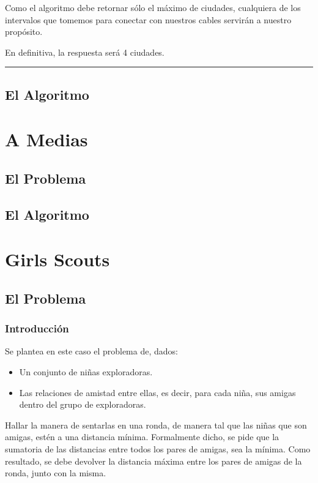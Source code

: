\documentclass[11pt]{article}
\newcommand{\linea}{\noindent\rule{12cm}{0.4pt}}
\begin{document}
Como el algoritmo debe retornar sólo el máximo de ciudades, cualquiera de los intervalos que tomemos para conectar con nuestros cables servirán a nuestro propósito.

En definitiva, la respuesta será 4 ciudades.

\linea

\subsection{El Algoritmo}


\newpage


\section{A Medias}

\subsection{El Problema}

\subsection{El Algoritmo}



\newpage


\section{Girls Scouts}

\subsection{El Problema}
 \subsubsection{Introducción}
Se plantea en este caso el problema de, dados:
\begin{itemize}

\item Un conjunto de niñas exploradoras.

\item Las relaciones de amistad entre ellas, es decir, para cada niña, sus amigas dentro del grupo de exploradoras.
\end{itemize}

Hallar la manera de sentarlas en una ronda, de manera tal que las niñas que son amigas, estén a una distancia mínima. Formalmente dicho, se pide que la sumatoria de las distancias entre todos los pares de amigas, sea la mínima. Como resultado, se debe devolver la distancia máxima entre los pares de amigas de la ronda, junto con la misma. 
\end{document}
